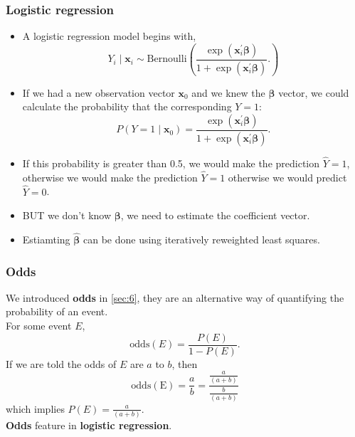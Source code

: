 \documentclass[a4paper]{article}\usepackage[]{graphicx}\usepackage[]{xcolor}
\begin{document}
\subsubsection{Logistic regression}
\begin{itemize}
	\item A logistic regression model begins with,
	\[
		Y_i \mid \symbf{x}_i \sim \mathrm{Bernoulli} \left( \frac{\exp(\symbf{x}_i^\prime \symbf{\beta})}{1+\exp(\symbf{x}^\prime_i\symbf{\beta})}. \right)
	\]
	\item If we had a new observation vector \( \symbf{x}_0 \) and we knew the \( \symbf{\beta} \) vector, we could calculate the probability that the corresponding \( Y = 1 \):
	\[
		P(Y = 1 \mid \symbf{x}_0) = \frac{\exp(\symbf{x}_i^\prime \symbf{\beta})}{1+\exp(\symbf{x}^\prime_i\symbf{\beta})}.
	\]
	\item If this probability is greater than 0.5, we would make the prediction \( \hat{Y} = 1 \), otherwise we would make the prediction \( \hat{Y} = 1 \) otherwise we would predict \( \hat{Y} = 0 \).
	\item BUT we don't know \( \symbf{\beta} \), we need to estimate the coefficient vector.
	\item Estiamting \( \hat{\symbf{\beta}} \) can be done using \textcolor{myred}{iteratively reweighted least squares}.
\end{itemize}
\subsubsection{Odds}
We introduced \textbf{odds} in \cref{sec:6}, they are an alternative way of quantifying the probability of an event.\\
For some event \( E \),
\[
	\mathrm{odds}(E) = \frac{P(E)}{1-P(E)}.
\]
If we are told the odds of \( E \) are \( a \) to \( b \), then
\[
	\mathrm{odds(E)} = \frac{a}{b} = \frac{\frac{a}{(a+b)}}{\frac{b}{(a+b)}}
\]
which implies \( P(E) = \frac{a}{(a+b)} \).\\
\textbf{Odds} feature in \textcolor{myblue}{\textbf{logistic regression}}.
\end{document}
